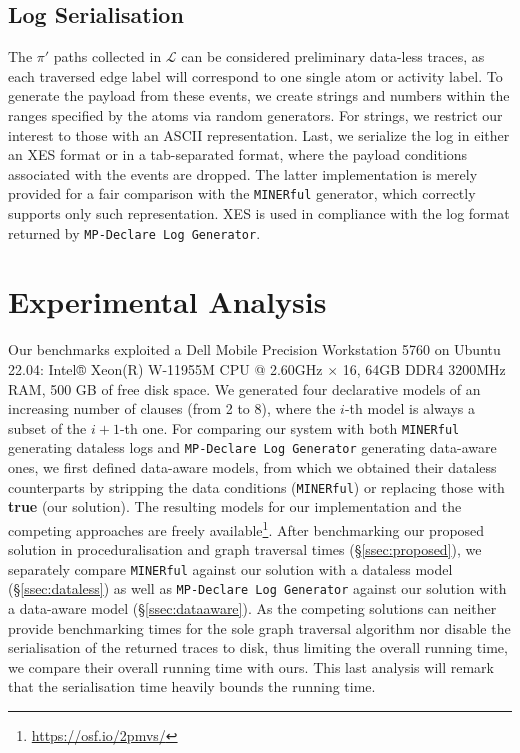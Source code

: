 \documentclass[acmengage]{acmart}
\begin{document}
\subsection{Log Serialisation}\label{sec:loggen}
The $\pi'$ paths collected in $\mathcal{L}$ can be considered preliminary data-less traces, as each traversed edge label will correspond to one single atom or activity label. 
To generate the payload from these events, we create strings and numbers within the ranges specified by the atoms via random generators. For strings, we restrict our interest to those with an ASCII representation. Last, we serialize the log in either an XES format or in a tab-separated format, where the payload conditions associated with the events are dropped. The latter implementation is merely provided for a fair comparison with the \texttt{MINERful} generator, which correctly supports only such representation. XES is used in compliance with the log format returned by \texttt{MP-Declare Log Generator}.

\section{Experimental Analysis}\label{sec:exp}
Our benchmarks exploited a Dell Mobile Precision Workstation 5760 on Ubuntu 22.04: Intel® Xeon(R) W-11955M CPU @ 2.60GHz $\times$ 16, 64GB DDR4 3200MHz RAM, 500 GB of free disk space. We generated four declarative models of an increasing number of clauses (from 2 to 8), where the $i$-th model is always a subset of the $i+1$-th one. For comparing our system with both \texttt{MINERful} generating dataless logs and
\texttt{MP-Declare Log Generator} generating data-aware ones, we first defined 
data-aware models, from which we obtained their dataless counterparts by stripping the data conditions (\texttt{MINERful}) or replacing those with \textbf{true} (our solution). The resulting models for our implementation and the competing approaches are freely available\footnote{\url{https://osf.io/2pmvs/}}. After benchmarking our proposed solution in proceduralisation and graph traversal times (\S\ref{ssec:proposed}), we separately compare \texttt{MINERful} against our solution with a dataless model (\S\ref{ssec:dataless}) as well as \texttt{MP-Declare Log Generator} against our solution with a data-aware model (\S\ref{ssec:dataaware}). As the competing solutions can neither provide benchmarking times for the sole graph traversal algorithm nor disable the serialisation of the returned traces to disk, thus limiting the overall running time, we compare their overall running time with ours. This last analysis will remark that the serialisation time heavily bounds the running time.
\end{document}
